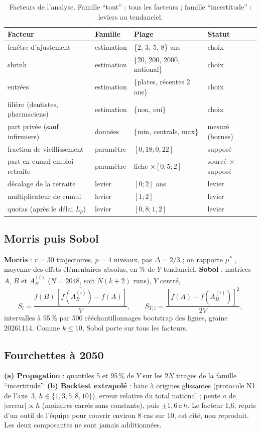 \begin{table}[h]\centering\small
\begin{tabular}{llll}
\toprule
Facteur & Famille & Plage & Statut \\
\midrule
fenêtre d'ajustement & estimation & \{2, 3, 5, 8\} ans & choix \\
shrink & estimation & \{20, 200, 2000, national\} & choix \\
entrées & estimation & \{plates, récentes 2 ans\} & choix \\
filière (dentistes, pharmaciens) & estimation & \{non, oui\} & choix \\
part privée (sauf infirmiers) & données & \{min, centrale, max\} & mesuré (bornes) \\
fraction de vieillissement & paramètre & $[0{,}18 ; 0{,}22]$ & supposé \\
part en cumul emploi-retraite & paramètre & fiche $\times [0{,}5 ; 2]$ & sourcé $\times$ supposé \\
décalage de la retraite & levier & $[0 ; 2]$ ans & levier \\
multiplicateur de cumul & levier & $[1 ; 2]$ & levier \\
quotas (après le délai $L_p$) & levier & $[0{,}8 ; 1{,}2]$ & levier \\
\bottomrule
\end{tabular}
\caption{Facteurs de l'analyse. Famille \enquote{tout} : tous les facteurs ; famille \enquote{incertitude} : leviers au
tendanciel.}\label{a5-tab:fac}
\end{table}

\subsection{Morris puis Sobol}
\textbf{Morris} : $r = 30$ trajectoires, $p = 4$ niveaux, pas $\Delta = 2/3$ ; on rapporte $\mu^*$ \citep{a5-campolongo2007}, moyenne des
effets élémentaires absolus, en \% de $Y$ tendanciel. \textbf{Sobol} : matrices $A$, $B$ et $A_B^{(i)}$
($N = 2048$, soit $N(k+2)$ runs), $Y$ centré,
\[
  S_i = \frac{\overline{f(B)\,[f(A_B^{(i)}) - f(A)]}}{V}, \qquad
  S_{T,i} = \frac{\overline{[f(A) - f(A_B^{(i)})]^2}}{2V},
\]
intervalles à 95\,\% par 500 rééchantillonnages bootstrap des lignes, graine \num{20261114}. Comme $k \le 10$,
Sobol porte sur tous les facteurs.

\subsection{Fourchettes à 2050}
\textbf{(a) Propagation} : quantiles 5 et 95\,\% de $Y$ sur les $2N$ tirages de la famille \enquote{incertitude}.
\textbf{(b) Backtest extrapolé} : banc à origines glissantes (protocole N1 de l'axe~3, $h \in \{1,3,5,8,10\}$),
erreur relative du total national ; pente $a$ de $|\text{erreur}| \propto h$ (moindres carrés sans constante),
puis $\pm 1{,}6\,a\,h$. Le facteur 1,6, repris d'un outil de l'équipe pour couvrir environ 8 cas sur 10, est cité,
non reproduit. Les deux composantes ne sont jamais additionnées.

